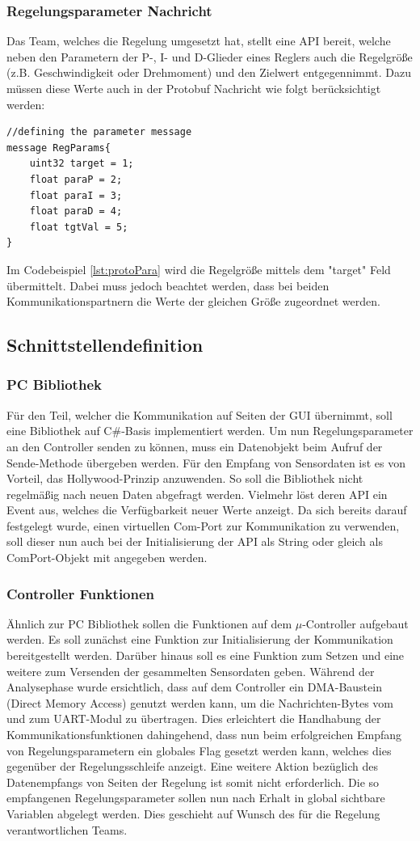 \subsubsection{Regelungsparameter Nachricht}
Das Team, welches die Regelung umgesetzt hat, stellt eine API bereit, welche neben den Parametern der P-, I- und D-Glieder eines Reglers auch die Regelgröße (z.B. Geschwindigkeit oder Drehmoment) und den Zielwert entgegennimmt. Dazu müssen diese Werte auch in der Protobuf Nachricht wie folgt berücksichtigt werden:
\begin{lstlisting}[caption=Beschreibung der Parameter Nachricht, label=lst:protoPara]
//defining the parameter message
message RegParams{
	uint32 target = 1;
	float paraP = 2;
	float paraI = 3;
	float paraD = 4;
	float tgtVal = 5;
}
\end{lstlisting}
Im Codebeispiel \ref{lst:protoPara} wird die Regelgröße mittels dem "target" Feld übermittelt. Dabei muss jedoch beachtet werden, dass bei beiden Kommunikationspartnern die Werte der gleichen Größe zugeordnet werden.
\subsection{Schnittstellendefinition}
\subsubsection{PC Bibliothek}
Für den Teil, welcher die Kommunikation auf Seiten der GUI übernimmt, soll eine Bibliothek auf C\#-Basis implementiert werden. Um nun Regelungsparameter an den Controller senden zu können, muss ein Datenobjekt beim Aufruf der Sende-Methode übergeben werden. Für den Empfang von Sensordaten ist es von Vorteil, das Hollywood-Prinzip anzuwenden. So soll die Bibliothek nicht regelmäßig nach neuen Daten abgefragt werden. Vielmehr löst deren API ein Event aus, welches die Verfügbarkeit neuer Werte anzeigt. Da sich bereits darauf festgelegt wurde, einen virtuellen Com-Port zur Kommunikation zu verwenden, soll dieser nun auch bei der Initialisierung der API als String oder gleich als ComPort-Objekt mit angegeben werden. 
\subsubsection{Controller Funktionen}
Ähnlich zur PC Bibliothek sollen die Funktionen auf dem $\mu$-Controller aufgebaut werden. Es soll zunächst eine Funktion zur Initialisierung der Kommunikation bereitgestellt werden. Darüber hinaus soll es eine Funktion zum Setzen und eine weitere zum Versenden der gesammelten Sensordaten geben. Während der Analysephase wurde ersichtlich, dass auf dem Controller ein DMA-Baustein (Direct Memory Access) genutzt werden kann, um die Nachrichten-Bytes vom und zum UART-Modul zu übertragen. Dies erleichtert die Handhabung der Kommunikationsfunktionen dahingehend, dass nun beim erfolgreichen Empfang von Regelungsparametern ein globales Flag gesetzt werden kann, welches dies gegenüber der Regelungsschleife anzeigt. Eine weitere Aktion bezüglich des Datenempfangs von Seiten der Regelung ist somit nicht erforderlich. Die so empfangenen Regelungsparameter sollen nun nach Erhalt in global sichtbare Variablen abgelegt werden. Dies geschieht auf Wunsch des für die Regelung verantwortlichen Teams.
